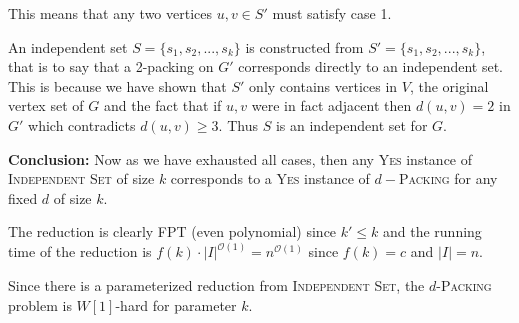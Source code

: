 \documentclass[10pt, a4paper]{article}
\theoremstyle{definition}
\newcommand{\mcO}{\mathcal{O}}
\begin{document}
This means that any two vertices $u,v \in S'$ must satisfy case 1.

An independent set $S = \{s_1,s_2,...,s_k\}$ is constructed from $S' = \{s_1,s_2,...,s_k\}$, that is to say that a 2-packing on $G'$ corresponds directly to an independent set. This is because we have shown that $S'$ only contains vertices in $V$, the original vertex set of $G$ and the fact that if $u,v$ were in fact adjacent then $d(u,v) = 2$ in $G'$ which contradicts $d(u,v) \geq 3$. Thus $S$ is an independent set for $G$.

\textbf{Conclusion:} Now as we have exhausted all cases, then any \textsc{Yes} instance of \textsc{Independent Set} of size $k$ corresponds to a \textsc{Yes} instance of $d-$\textsc{Packing} for any fixed $d$ of size $k$. 


The reduction is clearly FPT (even polynomial) since $k' \leq k$ and the running time of the reduction is $f(k) \cdot |I|^{\mcO(1)} = n^{\mcO(1)}$ since $f(k)=c$ and $|I| = n$.

Since there is a parameterized reduction from \textsc{Independent Set}, the $d$-\textsc{Packing} problem is $W[1]$-hard for parameter $k$. 





\end{document}
